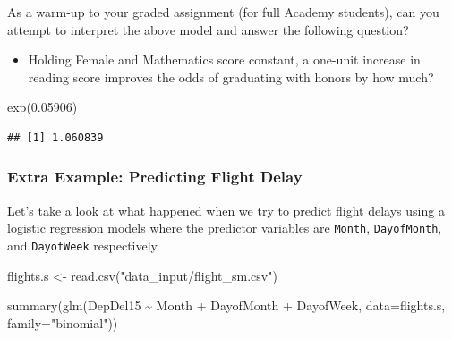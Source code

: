 \documentclass[
]{article}
\newenvironment{Shaded}{\begin{snugshade}}{\end{snugshade}}
\newcommand{\AttributeTok}[1]{\textcolor[rgb]{0.77,0.63,0.00}{#1}}
\newcommand{\FloatTok}[1]{\textcolor[rgb]{0.00,0.00,0.81}{#1}}
\newcommand{\FunctionTok}[1]{\textcolor[rgb]{0.00,0.00,0.00}{#1}}
\newcommand{\NormalTok}[1]{#1}
\newcommand{\OtherTok}[1]{\textcolor[rgb]{0.56,0.35,0.01}{#1}}
\newcommand{\SpecialCharTok}[1]{\textcolor[rgb]{0.00,0.00,0.00}{#1}}
\newcommand{\StringTok}[1]{\textcolor[rgb]{0.31,0.60,0.02}{#1}}
\providecommand{\tightlist}{%
  \setlength{\itemsep}{0pt}\setlength{\parskip}{0pt}}
\begin{document}
As a warm-up to your graded assignment (for full Academy students), can
you attempt to interpret the above model and answer the following
question?

\begin{itemize}
\tightlist
\item
  Holding Female and Mathematics score constant, a one-unit increase in
  reading score improves the odds of graduating with honors by how much?
\end{itemize}

\begin{Shaded}
\begin{Highlighting}[]
\FunctionTok{exp}\NormalTok{(}\FloatTok{0.05906}\NormalTok{)}
\end{Highlighting}
\end{Shaded}

\begin{verbatim}
## [1] 1.060839
\end{verbatim}

\hypertarget{extra-example-predicting-flight-delay}{%
\subsubsection{Extra Example: Predicting Flight
Delay}\label{extra-example-predicting-flight-delay}}

Let's take a look at what happened when we try to predict flight delays
using a logistic regression models where the predictor variables are
\texttt{Month}, \texttt{DayofMonth}, and \texttt{DayofWeek}
respectively.

\begin{Shaded}
\begin{Highlighting}[]
\NormalTok{flights.s }\OtherTok{\textless{}{-}} \FunctionTok{read.csv}\NormalTok{(}\StringTok{"data\_input/flight\_sm.csv"}\NormalTok{)}

\FunctionTok{summary}\NormalTok{(}\FunctionTok{glm}\NormalTok{(DepDel15 }\SpecialCharTok{\textasciitilde{}}\NormalTok{ Month }\SpecialCharTok{+}\NormalTok{ DayofMonth }\SpecialCharTok{+}\NormalTok{ DayofWeek, }\AttributeTok{data=}\NormalTok{flights.s, }\AttributeTok{family=}\StringTok{"binomial"}\NormalTok{))}
\end{Highlighting}
\end{Shaded}
\end{document}
